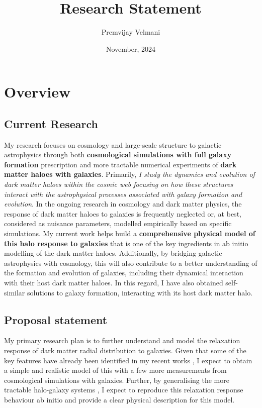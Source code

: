 \documentclass[12pt]{article}
\title{Research Statement}
\author{Premvijay Velmani}
\date{November, 2024}
\begin{document}
\maketitle


\section{Overview}
\subsection{Current Research}
My research focuses on cosmology and large-scale structure to galactic astrophysics through both \textbf{cosmological simulations with full galaxy formation} prescription and more tractable numerical experiments of \textbf{dark matter haloes with galaxies}. Primarily, \textit{I study the dynamics and evolution of dark matter haloes within the cosmic web focusing on how these structures interact with the astrophysical processes associated with galaxy formation and evolution}. In the ongoing research in cosmology and dark matter physics, the response of dark matter haloes to galaxies is frequently neglected or, at best, considered as nuisance parameters, modelled empirically based on specific simulations. My current work helps build a \textbf{comprehensive physical model of this halo response to galaxies} that is one of the key ingredients in ab initio modelling of the dark matter haloes. Additionally, by bridging galactic astrophysics with cosmology, this will also contribute to a better understanding of the formation and evolution of galaxies, including their dynamical interaction with their host dark matter haloes. In this regard, I have also obtained self-similar solutions to galaxy formation, interacting with its host dark matter halo.

\subsection{Proposal statement}
My primary research plan is to further understand and model the relaxation response of dark matter radial distribution to galaxies. Given that some of the key features have already been identified in my recent works \cite{2023MNRAS.520.2867V,2024arXiv240708030V,2024arXiv240804864V}, I expect to obtain a simple and realistic model of this with a few more measurements from cosmological simulations with galaxies. Further, by generalising the more tractable halo-galaxy systems \cite{2024JCAP...05..080V}, I expect to reproduce this relaxation response behaviour ab initio and provide a clear physical description for this model. 
\end{document}

